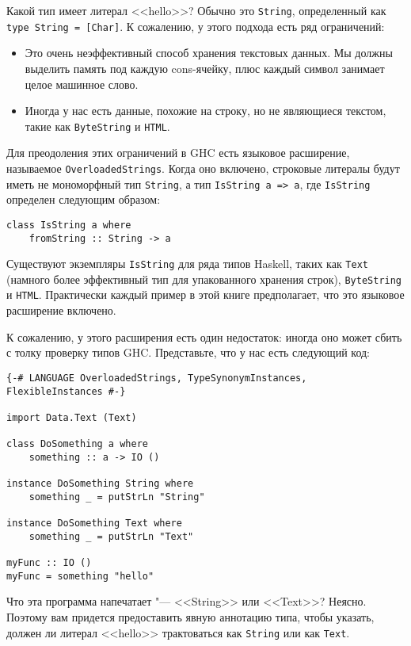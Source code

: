 Какой тип имеет литерал <<hello>>? Обычно это \lstinline'String', определенный как \lstinline'type String = [Char]'. К сожалению, у этого подхода есть ряд ограничений:
\begin{itemize}
\item Это очень неэффективный способ хранения текстовых данных. Мы должны выделить память под каждую cons-ячейку, плюс каждый символ занимает целое машинное слово.
\item Иногда у нас есть данные, похожие на строку, но не являющиеся текстом, такие как \lstinline'ByteString' и \lstinline'HTML'.
\end{itemize}

Для преодоления этих ограничений в GHC есть языковое расширение, называемое \lstinline'OverloadedStrings'. Когда оно включено, строковые литералы будут иметь не мономорфный тип \lstinline'String', а тип \lstinline'IsString a => a', где \lstinline'IsString' определен следующим образом:

\begin{lstlisting}
class IsString a where
    fromString :: String -> a
\end{lstlisting}

Существуют экземпляры \lstinline'IsString' для ряда типов Haskell, таких как \lstinline'Text' (намного более эффективный тип для упакованного хранения строк), \lstinline'ByteString' и \lstinline'HTML'. Практически каждый пример в этой книге предполагает, что это языковое расширение включено.

К сожалению, у этого расширения есть один недостаток: иногда оно может сбить с толку проверку типов GHC. Представьте, что у нас есть следующий код:

\begin{lstlisting}
{-# LANGUAGE OverloadedStrings, TypeSynonymInstances, FlexibleInstances #-}

import Data.Text (Text)

class DoSomething a where
    something :: a -> IO ()

instance DoSomething String where
    something _ = putStrLn "String"

instance DoSomething Text where
    something _ = putStrLn "Text"

myFunc :: IO ()
myFunc = something "hello"
\end{lstlisting}

Что эта программа напечатает "--- <<String>> или <<Text>>? Неясно. Поэтому вам придется предоставить явную аннотацию типа, чтобы указать, должен ли литерал <<hello>> трактоваться как \lstinline'String' или как \lstinline'Text'.

